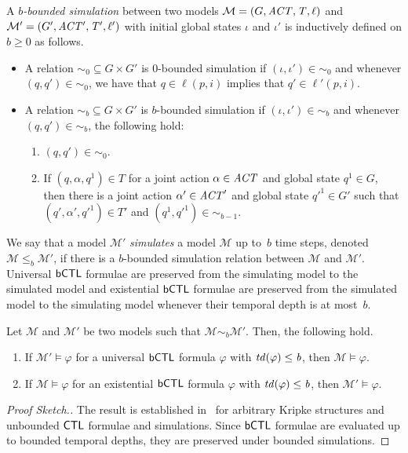 \begin{definition}
  A \emph{$b$-bounded simulation} between two models
  $\mathcal M = \left ( G, \it{ACT}, T, \ell \right )$ and
  $\mathcal{M'} = \left ( G', \it{ACT'}, T', \ell' \right )$ with initial global states
  $\iota$ and $\iota'$ is inductively defined on $b \geq 0$ as follows.
  \begin{itemize}[$\bullet$]
  \item A relation $\sim_0 \subseteq G \times G'$ is $0$-bounded simulation if
    $(\iota, \iota') \in \sim_0$ and whenever $(q, q') \in \sim_0$, we have
    that $q \in \ell(p,i)$ implies that $q' \in \ell'(p, i)$.
  \item A relation $\sim_b \subseteq G \times G'$ is $b$-bounded simulation if
    $(\iota, \iota') \in \sim_b$ and whenever $(q, q') \in \sim_b$, the
    following hold:
    \begin{enumerate}[1.]
    \item $(q, q') \in \sim_0$.
    \item If $(q, \alpha, q^1) \in T$ for a joint action $\alpha \in \it{ACT}$
      and global state $q^1 \in G$, then there is a joint action
      $\alpha' \in \it{ACT}'$ and global state $q'^1 \in G'$ such that
      $(q', \alpha', q'^1) \in T'$ and $(q^1, q'^1) \in \sim_{b - 1}$.
    \end{enumerate}
  \end{itemize}
\end{definition}

We say that a model $\mathcal{M'}$ \emph{simulates} a model $\mathcal M$ up
to~$b$ time steps, denoted $\mathcal M \leq_b \mathcal{M'}$, if there is a
$b$-bounded simulation relation between $\mathcal M$ and $\mathcal{M'}$.
Universal $\sf{bCTL}$ formulae are preserved from the simulating model to the
simulated model and existential $\sf{bCTL}$ formulae are preserved from the
simulated model to the simulating model whenever their temporal depth is at
most~$b$.

\begin{theorem} Let $\mathcal M$ and $\mathcal M'$ be two models such that $\mathcal
M \sim_b  \mathcal M'$. Then, the following hold.
\label{th:sim}
\begin{enumerate}
    \item If $\mathcal M' \models \varphi$ for a universal $\sf{bCTL}$ formula
    $\varphi$ with $\it{td}(\varphi) \leq b$, then $\mathcal M \models
    \varphi$.
    \item If $\mathcal M \models \varphi$ for an existential $\sf{bCTL}$ formula
    $\varphi$ with $\it{td}(\varphi) \leq b$, then $\mathcal M' \models
    \varphi$.
\end{enumerate}
\end{theorem}
\begin{proof}[Proof Sketch.]
The result is established in~\cite{ClarkeGrumbergLong94} for arbitrary Kripke
structures and unbounded $\sf{CTL}$ formulae and simulations. Since $\sf{bCTL}$ formulae
are evaluated up to bounded temporal depths, they are preserved under bounded
simulations.
\end{proof}

